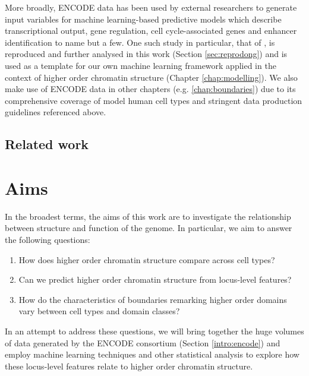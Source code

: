 \documentclass[a4paper,11pt,oneside]{book}
\begin{document}
More broadly, ENCODE data has been used by external researchers to generate input variables for machine learning-based predictive models which describe transcriptional output,\cite{Cheng2011} gene regulation,\cite{Althammer2012} cell cycle-associated genes \cite{Cheng2013} and enhancer identification\cite{Rajagopal2013} to name but a few. One such study in particular, that of \citet{Dong2012}, is reproduced and further analysed in this work (Section \ref{sec:reprodong}) and is used as a template for our own machine learning framework applied in the context of higher order chromatin structure (Chapter \ref{chap:modelling}). We also make use of ENCODE data in other chapters (e.g. \ref{chap:boundaries}) due to its comprehensive coverage of model human cell types and stringent data production guidelines referenced above.

\subsection{Related work}


\section{Aims}

In the broadest terms, the aims of this work are to investigate the relationship between structure and function of the genome. In particular, we aim to answer the following questions: 
\begin{enumerate}
\item How does higher order chromatin structure compare across cell types?
\item Can we predict higher order chromatin structure from locus-level features?
\item How do the characteristics of boundaries remarking higher order domains vary between cell types and domain classes?
\end{enumerate}

In an attempt to address these questions, we will bring together the huge volumes of data generated by the ENCODE consortium (Section \ref{intro:encode}) and employ machine learning techniques and other statistical analysis to explore how these locus-level features relate to higher order chromatin structure. 

\ifstandalone
\begin{small}

\end{small}
\fi
\end{document}
